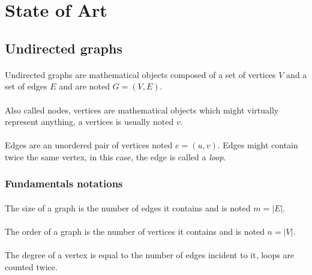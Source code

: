 \section{State of Art}

\subsection{Undirected graphs}

\paragraph{}
Undirected graphs are mathematical objects composed of a set of vertices $V$
and a set of edges $E$ and are noted $G = (V,E)$.

\paragraph{}
Also called nodes, vertices are mathematical objects which might virtually
represent anything, a vertices is usually noted $v$.

\paragraph{}
Edges are an unordered pair of vertices noted $e = (u,v)$. Edges might
contain twice the same vertex, in this case, the edge is called a {\em loop}.

\subsubsection{Fundamentals notations}

\paragraph{}
The size of a graph is the number of edges it contains and is noted
$m = |E|$.

\paragraph{}
The order of a graph is the number of vertices it contains and is noted
$n = |V|$.

\paragraph{}
The degree of a vertex is equal to the number of edges incident to it, loops
are counted twice.

